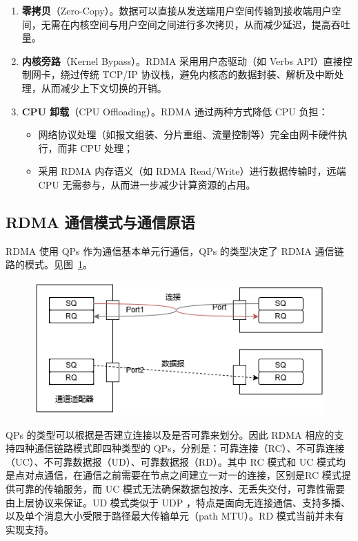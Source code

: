 {    \begin{enumerate}[label=\arabic*.]
        \item \textbf{零拷贝}（Zero-Copy）。数据可以直接从发送端用户空间传输到接收端用户空间，无需在内核空间与用户空间之间进行多次拷贝，从而减少延迟，提高吞吐量。
        \item \textbf{内核旁路}（Kernel Bypass）。RDMA 采用用户态驱动（如 Verbs API）直接控制网卡，绕过传统 TCP/IP 协议栈，避免内核态的数据封装、解析及中断处理，从而减少上下文切换的开销。
        \item \textbf{CPU 卸载}（CPU Offloading）。RDMA 通过两种方式降低 CPU 负担：
              \begin{itemize}
                  \item 网络协议处理（如报文组装、分片重组、流量控制等）完全由网卡硬件执行，而非 CPU 处理；
                  \item 采用 RDMA 内存语义（如 RDMA Read/Write）进行数据传输时，远端 CPU 无需参与，从而进一步减少计算资源的占用。
              \end{itemize}
    \end{enumerate}

    \subsection{RDMA 通信模式与通信原语}
    RDMA 使用 QPs 作为通信基本单元行通信，QPs 的类型决定了 RDMA 通信链路的模式。见图~\ref{fig:rdma-queue-pairs}。
    \begin{figure}[!htbp]
        \centering
        \includegraphics[width=\linewidth]{Img/QueuePairs.png}
        \label{fig:rdma-queue-pairs}
    \end{figure}

    QPs 的类型可以根据是否建立连接以及是否可靠来划分。因此 RDMA 相应的支持四种通信链路模式即四种类型的 QPs，分别是：可靠连接（RC）、不可靠连接（UC）、不可靠数据报（UD）、可靠数据报（RD）。其中 RC 模式和 UC 模式均是点对点通信，在通信之前需要在节点之间建立一对一的连接，区别是RC 模式提供可靠的传输服务，而 UC 模式无法确保数据包按序、无丢失交付，可靠性需要由上层协议来保证。UD 模式类似于 UDP ，特点是面向无连接通信、支持多播、以及单个消息大小受限于路径最大传输单元（path MTU）。RD 模式当前并未有实现支持。

}
